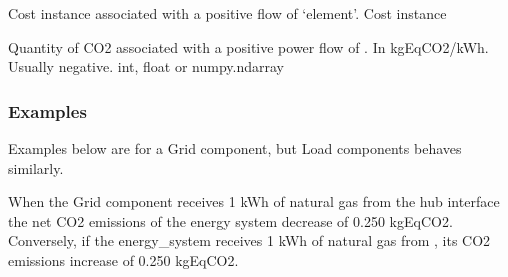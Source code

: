 \documentclass[letterpaper,10pt,english]{sphinxmanual}
\begin{document}
\begin{fulllineitems}
\begin{fulllineitems}
\label{\detokenize{generated/tamos.elementIO.Load:tamos.elementIO.Load.element_cost}}
\pysigstartsignatures
{}
\pysigstopsignatures
\sphinxAtStartPar
Cost instance associated with a positive flow of ‘element’.
Cost instance

\end{fulllineitems}


\begin{fulllineitems}
\label{\detokenize{generated/tamos.elementIO.Load:tamos.elementIO.Load.emissions}}
\pysigstartsignatures
{}
\pysigstopsignatures
\sphinxAtStartPar
Quantity of CO2 associated with a positive power flow of .
In kgEqCO2/kWh.
Usually negative.
int, float or numpy.ndarray
\subsubsection*{Examples}

\sphinxAtStartPar
Examples below are for a Grid component, but Load components behaves similarly.

\begin{sphinxVerbatim}[commandchars=\\\{\}]
  
   
\end{sphinxVerbatim}

\sphinxAtStartPar
When the Grid component  receives 1 kWh of natural gas from the hub interface
the net CO2 emissions of the energy system decrease of 0.250 kgEqCO2.
Conversely, if the energy\_system receives 1 kWh of natural gas from ,
its CO2 emissions increase of 0.250 kgEqCO2.

\begin{sphinxVerbatim}[commandchars=\\\{\}]
  
   
\end{sphinxVerbatim}


\end{fulllineitems}
\end{fulllineitems}
\end{document}
